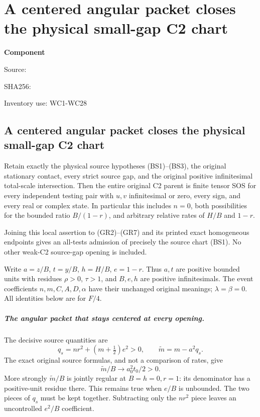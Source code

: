 \chapter{A centered angular packet closes the physical small-gap C2 chart}
\label{component:p7c5e0b890910}
\noindent\textbf{Component }\par
{\small\noindent Source: \par}
{\small\noindent SHA256: \par}
{\small\noindent Inventory use: WC1-WC28\par}
\medskip
\section{A centered angular packet closes the physical small-gap C2 chart}
\label{p7c5e0b890910:sec:r13-small-gap-circuit}

\begin{theorem}
Retain exactly the physical source hypotheses (BS1)--(BS3), the
original stationary contact, every strict source gap, and the original
positive infinitesimal total-scale intersection. Then the entire
original C2 parent is finite tensor SOS for every independent testing
pair with $u,v$ infinitesimal or zero, every sign, and every real or
complex state. In particular this includes $n=0$, both possibilities
for the bounded ratio $B/(1-r)$, and arbitrary relative rates of
$H/B$ and $1-r$.

Joining this local assertion to (GR2)--(GR7) and its printed exact
homogeneous endpoints gives an all-tests admission of precisely the
source chart (BS1). No other weak-C2 source-gap opening is included.
\end{theorem}

Write $a=z/B$, $t=y/B$, $h=H/B$, $e=1-r$. Thus $a,t$ are
positive bounded units with residues $\rho>0$, $\tau>1$, and
$B,e,h$ are positive infinitesimals. The event coefficients $n,m,C,A,D,
\alpha$ have their unchanged original meanings; $\lambda=\beta=0$.
All identities below are for $F/4$.

\paragraph{The angular packet that stays centered at every opening.}
The decisive source quantities are
\[
 q_s=nr^2+(m+\tfrac12)e^2>0,\qquad
 \widetilde m=m-a^2q_s.                                      \tag{WC1}
\]
The exact original source formulas, and not a comparison of rates,
give
\[
 \widetilde m/B\longrightarrow a_0^2t_0/2>0.                 \tag{WC2}
\]
More strongly $\widetilde m/B$ is jointly regular at
$B=h=0,r=1$: its denominator has a positive-unit residue there.
This remains true when $e/B$ is unbounded. The two pieces of $q_s$
must be kept together. Subtracting only the $nr^2$ piece leaves an
uncontrolled $e^2/B$ coefficient.


